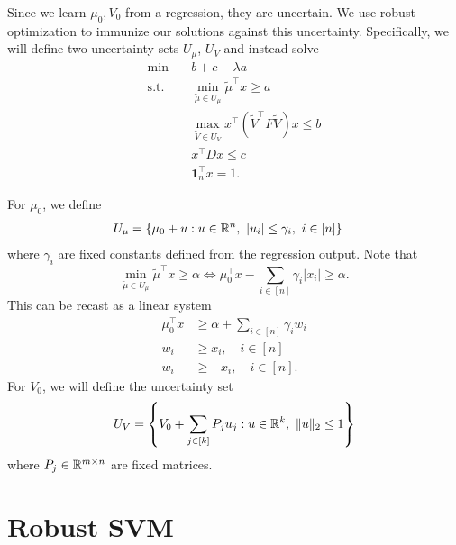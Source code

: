 \documentclass[11pt,oneside]{article}
\theoremstyle{plain}
\theoremstyle{definition}
\theoremstyle{remark}
\begin{document}
Since we learn $\mu_0, V_0$ from a regression, they are uncertain. We use robust optimization to immunize our solutions against this uncertainty. Specifically, we will define two uncertainty sets $U_\mu$, $U_V$ and instead solve
\begin{align*}
\min &\quad b + c - \lambda a\\
\text{s.t.} &\quad \min_{\tilde{\mu} \in U_\mu} \tilde{\mu}^\top x \geq a\\
&\quad \max_{\tilde{V} \in U_V} x^\top (\tilde{V}^\top F \tilde{V}) x \leq b\\
&\quad x^\top D x \leq c\\
&\quad \bm{1}_n^\top x = 1.
\end{align*}

For $\mu_0$, we define
\begin{align*}
U_\mu &= \{ \mu_0 + u : u \in \mathbb{R}^n,\ |u_i| \leq \gamma_i, \ i \in [n] \}
\end{align*}
where $\gamma_i$ are fixed constants defined from the regression output. Note that
\[ \min_{\tilde{\mu} \in U_\mu} \tilde{\mu}^\top x \geq \alpha \iff \mu_0^\top x - \sum_{i \in [n]} \gamma_i |x_i| \geq \alpha. \]
This can be recast as a linear system
\begin{align*}
\mu_0^\top x  &\geq \alpha + \sum_{i \in [n]} \gamma_i w_i\\
w_i &\geq x_i, \quad i \in [n]\\
w_i &\geq -x_i, \quad i \in [n].
\end{align*}
For $V_0$, we will define the uncertainty set
\[ U_V = \left\{ V_0 + \sum_{j \in [k]} P_j u_j : u \in \mathbb{R}^k,\ \|u\|_2 \leq 1 \right\} \]
where $P_j \in \mathbb{R}^{m \times n}$ are fixed matrices.



\section{Robust SVM}
\end{document}
